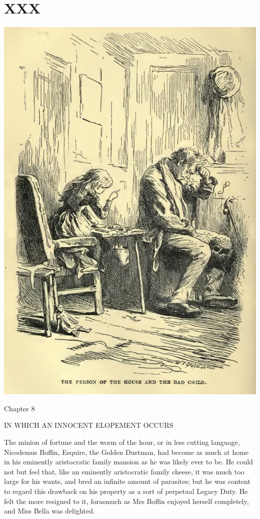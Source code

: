 
\chapter{XXX}

\includegraphics[scale=2.3]{02-02-01}

Chapter 8

IN WHICH AN INNOCENT ELOPEMENT OCCURS


The minion of fortune and the worm of the hour, or in less cutting
language, Nicodemus Boffin, Esquire, the Golden Dustman, had become
as much at home in his eminently aristocratic family mansion as he
was likely ever to be. He could not but feel that, like an eminently
aristocratic family cheese, it was much too large for his wants, and
bred an infinite amount of parasites; but he was content to regard this
drawback on his property as a sort of perpetual Legacy Duty. He felt the
more resigned to it, forasmuch as Mrs Boffin enjoyed herself completely,
and Miss Bella was delighted.

